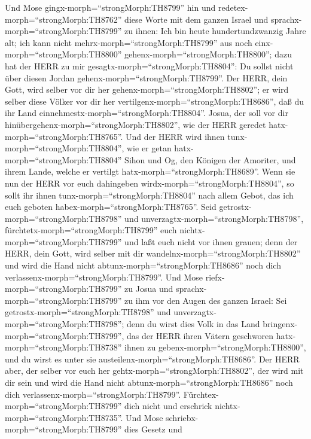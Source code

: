  Und Mose gingx-morph=``strongMorph:TH8799'' hin und
redetex-morph=``strongMorph:TH8762'' diese Worte mit dem ganzen Israel
 und sprachx-morph=``strongMorph:TH8799'' zu ihnen: Ich bin
heute hundertundzwanzig Jahre alt; ich kann nicht
mehrx-morph=``strongMorph:TH8799'' aus noch
einx-morph=``strongMorph:TH8800'' gehenx-morph=``strongMorph:TH8800'';
dazu hat der HERR zu mir gesagtx-morph=``strongMorph:TH8804'': Du sollst
nicht über diesen Jordan gehenx-morph=``strongMorph:TH8799''.
 Der HERR, dein Gott, wird selber vor dir her
gehenx-morph=``strongMorph:TH8802''; er wird selber diese Völker vor dir
her vertilgenx-morph=``strongMorph:TH8686'', daß du ihr Land
einnehmestx-morph=``strongMorph:TH8804''. Josua, der soll vor dir
hinübergehenx-morph=``strongMorph:TH8802'', wie der HERR geredet
hatx-morph=``strongMorph:TH8765''.  Und der HERR wird ihnen
tunx-morph=``strongMorph:TH8804'', wie er getan
hatx-morph=``strongMorph:TH8804'' Sihon und Og, den Königen der
Amoriter, und ihrem Lande, welche er vertilgt
hatx-morph=``strongMorph:TH8689''.  Wenn sie nun der HERR
vor euch dahingeben wirdx-morph=``strongMorph:TH8804'', so sollt ihr
ihnen tunx-morph=``strongMorph:TH8804'' nach allem Gebot, das ich euch
geboten habex-morph=``strongMorph:TH8765''.  Seid
getrostx-morph=``strongMorph:TH8798'' und
unverzagtx-morph=``strongMorph:TH8798'',
fürchtetx-morph=``strongMorph:TH8799'' euch
nichtx-morph=``strongMorph:TH8799'' und laßt euch nicht vor ihnen
grauen; denn der HERR, dein Gott, wird selber mit dir
wandelnx-morph=``strongMorph:TH8802'' und wird die Hand nicht
abtunx-morph=``strongMorph:TH8686'' noch dich
verlassenx-morph=``strongMorph:TH8799''.  Und Mose
riefx-morph=``strongMorph:TH8799'' zu Josua und
sprachx-morph=``strongMorph:TH8799'' zu ihm vor den Augen des ganzen
Israel: Sei getrostx-morph=``strongMorph:TH8798'' und
unverzagtx-morph=``strongMorph:TH8798''; denn du wirst dies Volk in das
Land bringenx-morph=``strongMorph:TH8799'', das der HERR ihren Vätern
geschworen hatx-morph=``strongMorph:TH8738'' ihnen zu
gebenx-morph=``strongMorph:TH8800'', und du wirst es unter sie
austeilenx-morph=``strongMorph:TH8686''.  Der HERR aber, der
selber vor euch her gehtx-morph=``strongMorph:TH8802'', der wird mit dir
sein und wird die Hand nicht abtunx-morph=``strongMorph:TH8686'' noch
dich verlassenx-morph=``strongMorph:TH8799''.
Fürchtex-morph=``strongMorph:TH8799'' dich nicht und erschrick
nichtx-morph=``strongMorph:TH8735''.  Und Mose
schriebx-morph=``strongMorph:TH8799'' dies Gesetz und
